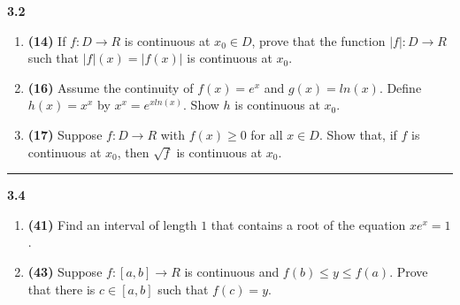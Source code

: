 \documentclass[fleqn]{article}
\begin{document}
  \textbf{3.2}
  \begin{enumerate}
    \item \textbf{(14)} If $f: D \longrightarrow R$ is continuous at $x_0 \in D$, prove that the function $|f|: D \longrightarrow R$
    such that $|f|(x)=|f(x)|$ is continuous at $x_0$.


    \item \textbf{(16)} Assume the continuity of $f(x)=e^x$ and $g(x)=ln(x)$. Define $h(x)=x^x$ by $x^x=e^{x ln(x)}$. Show $h$ is continuous
    at $x_0$.
    

    \item \textbf{(17)} Suppose $f: D \longrightarrow R$ with $f(x) \geq 0$ for all $x \in D$. Show that, if $f$ is continuous at $x_0$, then
    $\sqrt{f}$ is continuous at $x_0$.

  \end{enumerate}

  \rule{15cm}{2pt}

  \textbf{3.4}
  \begin{enumerate}
    \item \textbf{(41)} Find an interval of length $1$ that contains a root of the equation $x e^x=1$.


    \item \textbf{(43)} Suppose $f: [a, b] \longrightarrow R$ is continuous and $f(b) \leq y \leq f(a)$. Prove that there is
    $c \in [a, b]$ such that $f(c)=y$.
    
  \end{enumerate}
\end{document}
